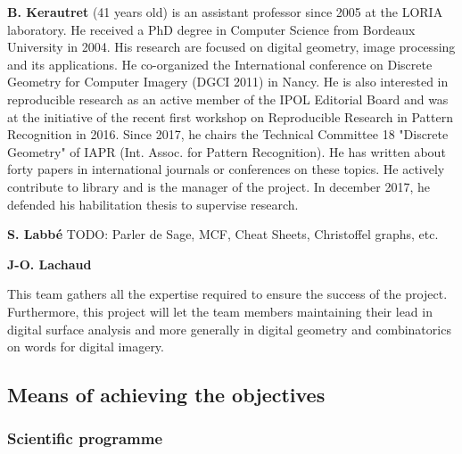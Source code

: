   
 \textbf{B. Kerautret} (41 years old) is an assistant professor since 2005
 at the LORIA laboratory. He received a PhD degree in Computer
 Science from Bordeaux University in 2004.  His research are
 focused on digital geometry, image processing and its applications.
 He co-organized the International conference on Discrete
 Geometry for Computer Imagery (DGCI 2011) in Nancy. He
 is also interested in reproducible research as an active member of the
 IPOL Editorial Board and was at the initiative of the recent
 first workshop on Reproducible Research in Pattern Recognition in
 2016.
 Since 2017, he chairs the Technical Committee 18 "Discrete Geometry" of IAPR
 (Int. Assoc. for Pattern Recognition). He has written
 about forty papers in international journals or conferences on these
 topics. He actively contribute to {\DGtal} library and is the manager of
 the {\DGtalTools} project.
 In december 2017, he defended his habilitation thesis to supervise research.
 

\textbf{S. Labb\'{e}} 
TODO: Parler de Sage, MCF, Cheat Sheets, Christoffel graphs, etc.

\textbf{J-O. Lachaud}


This team gathers all the expertise required to ensure the success of the project.
Furthermore, this project will let the team members maintaining their lead in digital surface analysis 
and more generally in digital geometry and combinatorics on words for digital imagery. 


\subsection{Means of achieving the objectives}


\subsubsection{Scientific programme}
\label{sec:wp}


